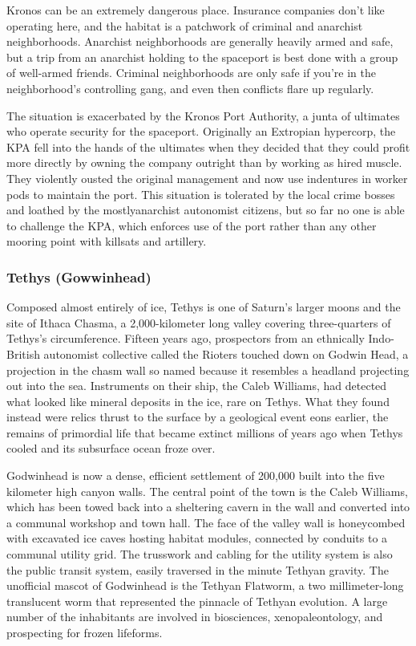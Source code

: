 Kronos can be an extremely dangerous place. Insurance companies don't like operating here, and the habitat is a patchwork of criminal and anarchist neighborhoods. Anarchist neighborhoods are generally heavily armed and safe, but a trip from an anarchist holding to the spaceport is best done with a group of well-armed friends. Criminal neighborhoods are only safe if you're in the neighborhood's controlling gang, and even then conflicts flare up regularly. 

The situation is exacerbated by the Kronos Port Authority, a junta of ultimates who operate security for the spaceport. Originally an Extropian hypercorp, the KPA fell into the hands of the ultimates when they decided that they could profit more directly by owning the company outright than by working as hired muscle. They violently ousted the original management and now use indentures in worker pods to maintain the port. This situation is tolerated by the local crime bosses and loathed by the mostlyanarchist autonomist citizens, but so far no one is able to challenge the KPA, which enforces use of the port rather than any other mooring point with killsats and artillery. 

\subsubsection{Tethys (Gowwinhead)} \label{sec:tethys-gowwinhead} 

Composed almost entirely of ice, Tethys is one of Saturn's larger moons and the site of Ithaca Chasma, a 2,000-kilometer long valley covering three-quarters of Tethys's circumference. Fifteen years ago, prospectors from an ethnically Indo-British autonomist collective called the Rioters touched down on Godwin Head, a projection in the chasm wall so named because it resembles a headland projecting out into the sea. Instruments on their ship, the Caleb Williams, had detected what looked like mineral deposits in the ice, rare on Tethys. What they found instead were relics thrust to the surface by a geological event eons earlier, the remains of primordial life that became extinct millions of years ago when Tethys cooled and its subsurface ocean froze over. 

Godwinhead is now a dense, efficient settlement of 200,000 built into the five kilometer high canyon walls. The central point of the town is the Caleb Williams, which has been towed back into a sheltering cavern in the wall and converted into a communal workshop and town hall. The face of the valley wall is honeycombed with excavated ice caves hosting habitat modules, connected by conduits to a communal utility grid. The trusswork and cabling for the utility system is also the public transit system, easily traversed in the minute Tethyan gravity. The unofficial mascot of Godwinhead is the Tethyan Flatworm, a two millimeter-long translucent worm that represented the pinnacle of Tethyan evolution. A large number of the inhabitants are involved in biosciences, xenopaleontology, and prospecting for frozen lifeforms. 

